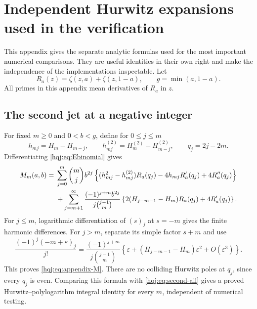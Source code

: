 \appendix
\section{Independent Hurwitz expansions used in the verification}
\label{hqj:sec:appendix}

This appendix gives the separate analytic formulas used for the most
important numerical comparisons. They are useful identities in their
own right and make the independence of the implementations inspectable.
Let
\[
R_a(z)=\zeta(z,a)+\zeta(z,1-a),\qquad g=\min(a,1-a).
\]
All primes in this appendix mean derivatives of $R_a$ in $z$.

\subsection{The second jet at a negative integer}
For fixed $m\ge0$ and $0<b<g$, define for $0\le j\le m$
\[
h_{mj}=H_m-H_{m-j},\qquad
h_{mj}^{(2)}=H_m^{(2)}-H_{m-j}^{(2)},\qquad q_j=2j-2m.
\]
Differentiating \eqref{hqj:eq:Ebinomial} gives
\begin{align}
M_m(a,b)={}&\sum_{j=0}^m\binom mjb^{2j}
\left\{(h_{mj}^2-h_{mj}^{(2)})R_a(q_j)
-4h_{mj}R_a'(q_j)+4R_a''(q_j)\right\}
\notag\\
&+\sum_{j=m+1}^{\infty}
\frac{(-1)^{j+m}b^{2j}}{j\binom{j-1}{m}}
\left\{2(H_{j-m-1}-H_m)R_a(q_j)+4R_a'(q_j)\right\}.
\label{hqj:eq:appendix-M}
\end{align}
For $j\le m$, logarithmic differentiation of $(s)_j$ at $s=-m$
gives the finite harmonic differences. For $j>m$, separate its simple
factor $s+m$ and use
\[
\frac{(-1)^j(-m+\varepsilon)_j}{j!}
=\frac{(-1)^{j+m}}{j\binom{j-1}{m}}
\left\{\varepsilon+(H_{j-m-1}-H_m)\varepsilon^2+O(\varepsilon^3)\right\}.
\]
This proves \eqref{hqj:eq:appendix-M}. There are no colliding Hurwitz
poles at $q_j$, since every $q_j$ is even. Comparing this formula with
\eqref{hqj:eq:second-all} gives a proved Hurwitz--polylogarithm integral
identity for every $m$, independent of numerical testing.

